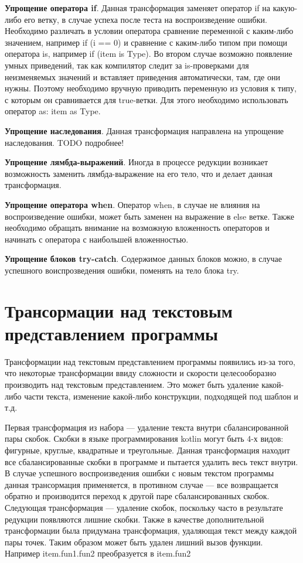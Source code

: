 \textbf{Упрощение оператора if}. Данная трансформация заменяет оператор if на какую-либо его ветку, в случае успеха после теста на воспроизведение ошибки. Необходимо различать в условии оператора сравнение переменной с каким-либо значением, например if (i == 0) и сравнение с каким-либо типом при помощи оператора is, например if (item is Type). Во втором случае возможно появление умных приведений, так как компилятор следит за is-проверками для неизменяемых значений и вставляет приведения автоматически, там, где они нужны. Поэтому необходимо вручную приводить переменную из условия к типу, с которым он сравнивается для true-ветки. Для этого необходимо использовать оператор as: item as Type.

\textbf{Упрощение наследования}. Данная трансформация направлена на упрощение наследования. TODO подробнее!

\textbf{Упрощение лямбда-выражений}. Иногда в процессе редукции возникает возможность заменить лямбда-выражение на его тело, что и делает данная трансформация. 

\textbf{Упрощение оператора when}. Оператор when, в случае не влияния на воспроизведение ошибки, может быть заменен на выражение в else ветке. Также необходимо обращать внимание на возможную вложенность операторов и начинать с оператора с наибольшей вложенностью.

\textbf{Упрощение блоков try-catch}. Содержимое данных блоков можно, в случае успешного воиспрозведения ошибки, поменять на тело блока try.


\section{Трансормации над текстовым представлением программы}
Трансформации над текстовым представлением программы появились из-за того, что некоторые трансформации ввиду сложности и скорости целесооборазно производить над текстовым представлением. Это может быть удаление какой-либо части текста, изменение какой-либо конструкции, подходящей под шаблон и т.д.

Первая трансформация из набора --- удаление текста внутри сбалансированной пары скобок. Скобки в языке программирования kotlin могут быть 4-х видов: фигурные, круглые, квадратные и треугольные. Данная трансформация находит все сбалансированные скобки в программе и пытается удалить весь текст внутри. В случае успешного воспроизведения ошибки с новым текстом программы данная трансормация применяется, в противном случае --- все возвращается обратно и производится переход к другой паре сбалансированных скобок. Следующая трансформация --- удаление скобок, поскольку часто в результате редукции появляются лишние скобки. Также в качестве дополнительной трансформации была придумана трансформация, удаляющая текст между каждой пары точек. Таким образом может быть удален лишний вызов функции. Например item.fun1.fun2 преобразуется в item.fun2

